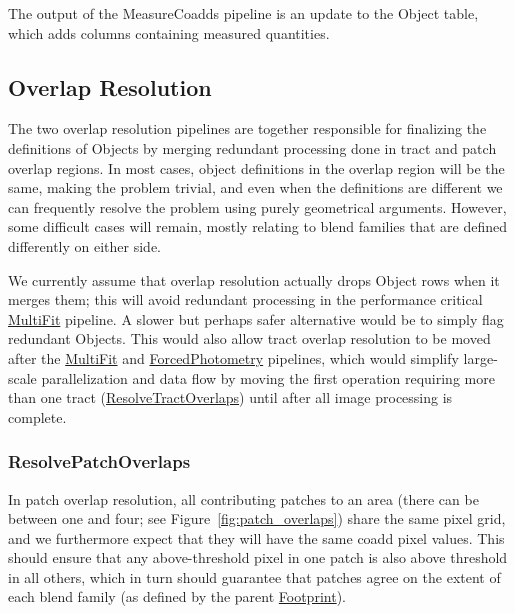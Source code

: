 The output of the MeasureCoadds pipeline is an update to the Object table, which adds columns containing measured quantities.

\subsection{Overlap Resolution}
\label{sec:drp_overlap_resolution}

The two overlap resolution pipelines are together responsible for finalizing the definitions of Objects by merging redundant processing done in tract and patch overlap regions.  In most cases, object definitions in the overlap region will be the same, making the problem trivial, and even when the definitions are different we can frequently resolve the problem using purely geometrical arguments.  However, some difficult cases will remain, mostly relating to blend families that are defined differently on either side.

We currently assume that overlap resolution actually drops Object rows when it merges them; this will avoid redundant processing in the performance critical \hyperref[sec:drpMultiFit]{MultiFit} pipeline.  A slower but perhaps safer alternative would be to simply flag redundant Objects.  This would also allow tract overlap resolution to be moved after the \hyperref[sec:drpMultiFit]{MultiFit} and \hyperref[sec:drpForcedPhotometry]{ForcedPhotometry} pipelines, which would simplify large-scale parallelization and data flow by moving the first operation requiring more than one tract (\hyperref[sec:drpResolveTractOverlaps]{ResolveTractOverlaps}) until after all image processing is complete.

\subsubsection{ResolvePatchOverlaps}
\label{sec:drpResolvePatchOverlaps}

In patch overlap resolution, all contributing patches to an area (there can be between one and four; see Figure~\ref{fig:patch_overlaps}) share the same pixel grid, and we furthermore expect that they will have the same coadd pixel values.  This should ensure that any above-threshold pixel in one patch is also above threshold in all others, which in turn should guarantee that patches agree on the extent of each blend family (as defined by the parent \hyperref[sec:spFootprints]{Footprint}).

